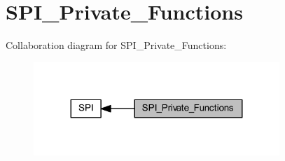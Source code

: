 \hypertarget{group___s_p_i___private___functions}{}\section{S\+P\+I\+\_\+\+Private\+\_\+\+Functions}
\label{group___s_p_i___private___functions}
Collaboration diagram for S\+P\+I\+\_\+\+Private\+\_\+\+Functions\+:
\nopagebreak
\begin{figure}[H]
\begin{center}
\leavevmode
\includegraphics[width=263pt]{group___s_p_i___private___functions}
\end{center}
\end{figure}
